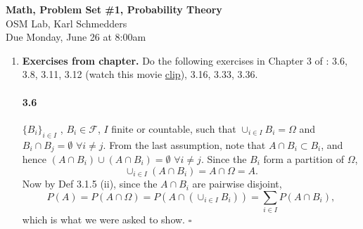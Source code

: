 \documentclass[letterpaper,12pt]{article}
\theoremstyle{definition}
\begin{document}
\begin{flushleft}
   \textbf{\large{Math, Problem Set \#1, Probability Theory}} \\[5pt]
   OSM Lab, Karl Schmedders \\[5pt]
   Due Monday, June 26 at 8:00am
\end{flushleft}

\vspace{5mm}

\begin{enumerate}
	\item {\bf Exercises from chapter.} Do the following exercises in Chapter 3 of \citet{HJ17}: 3.6, 3.8, 3.11, 3.12 (watch this movie \href{https://www.youtube.com/watch?v=Zr_xWfThjJ0}{clip}), 3.16, 3.33, 3.36.
    
    \paragraph{3.6} $\{B_i\}_{i \in I}$ ,  $ B_i \in \mathscr{F}$,  $I$ finite or countable, such that  $\cup_{i \in I}B_i = \Omega$ and  $B_i \cap B_j = \emptyset $ $ \forall i \neq j$.  From the last assumption, note that  $A \cap B_i  \subset B_i$, and hence  $(A \cap B_i)  \cup (A \cap B_i) = \emptyset $ $ \forall i \neq j$.  Since the $B_i$ form a partition  of $\Omega$,  $$\cup_{i \in I}(A \cap B_i) = A \cap \Omega = A .$$
    Now by  Def 3.1.5  (ii), since the $A \cap B_i$ are pairwise disjoint,  $$P(A) = P(A  \cap \Omega) = P(A  \cap (\cup_{i \in I}B_i)) = \sum_{i \in I}P(A \cap B_i) ,$$
    which is what we were asked to show. $\square$
    

\end{enumerate}
\end{document}
